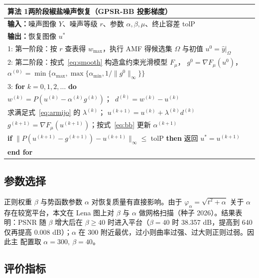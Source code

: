 \documentclass[withoutpreface,bwprint]{cumcmthesis}
\newenvironment{algtable}[1]{%
  \par\medskip\noindent
  \begin{minipage}{\textwidth}\scriptsize
  \begin{tabular}{p{\dimexpr\textwidth-2\tabcolsep}}
    \toprule
    \textbf{#1} \\
    \midrule
}{%
    \\ \bottomrule
  \end{tabular}
  \end{minipage}
  \par\medskip
}
\begin{document}
\begin{algtable}{算法 1\quad 两阶段椒盐噪声恢复（GPSR-BB 投影梯度）}
\textbf{输入：}噪声图像 $Y$、噪声等级 $r$、参数 $\alpha,\beta,\mu$、终止容差 tolP \\
\textbf{输出：}恢复图像 $u^{*}$ \\
1: 第一阶段：按 $r$ 查表得 $w_{\max}$，执行 AMF 得候选集 $\Omega$ 与初值
$u^{0}=\hat y|_{\Omega}$ \\
2: 第二阶段：按式~\eqref{eq:smooth} 构造盒约束光滑模型 $F_{\mu}$，
$g^{0}=\nabla F_{\mu}(u^{0})$，
$\alpha^{(0)}=\min\{\alpha_{\max},
\max\{\alpha_{\min},1/\|g^{0}\|_{\infty}\}\}$ \\
3: \textbf{for} $k=0,1,2,\dots$ \textbf{do} \\
\hspace{1.5em} $w^{(k)}=P(u^{(k)}-\alpha^{(k)}g^{(k)})$；\ $d^{(k)}=w^{(k)}-u^{(k)}$ \\
\hspace{1.5em} 求满足式~\eqref{eq:armijo} 的 $\lambda^{(k)}$；
$u^{(k+1)}=u^{(k)}+\lambda^{(k)}d^{(k)}$ \\
\hspace{1.5em} $g^{(k+1)}=\nabla F_{\mu}(u^{(k+1)})$；按式~\eqref{eq:bb} 更新
$\alpha^{(k+1)}$ \\
\hspace{1.5em} \textbf{if} $\|P(u^{(k+1)}-g^{(k+1)})-u^{(k+1)}\|_{\infty}\le$ tolP
\textbf{then} 返回 $u^{*}=u^{(k+1)}$ \\
\textbf{end for}
\end{algtable}

\subsection{参数选择}

正则权重 $\beta$ 与势函数参数 $\alpha$ 对恢复质量有直接影响。由于
$\varphi_{\alpha}=\sqrt{t^{2}+\alpha}$ 关于 $\alpha$ 存在较宽平台，本文在 Lena
图上对 $\beta$ 与 $\alpha$ 做网格扫描（种子 2026）。结果表明：PSNR 随 $\beta$
增大后在 $\beta\ge40$ 时进入平台（$\beta=40$ 时 38.357 dB，提高到 640 仅再提高
0.008 dB）；$\alpha$ 在 300 附近最优，过小则曲率过强、过大则正则过弱。因此主
配置取 $\alpha=300,\ \beta=40$。

\subsection{评价指标}
\end{document}
